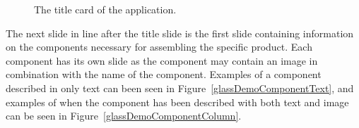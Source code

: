 	
	\begin{figure}[ht!]
		\centering
   		 \qquad
   		 \qquad
		\caption{The title card of the application.}
		\label{glassDemoTitleCard}
	\end{figure}
	
The next slide in line after the title slide is the first slide containing information on the components necessary for assembling the specific product. Each component has its own slide as the component may contain an image in combination with the name of the component. Examples of a component described in only text can been seen in Figure~\ref{glassDemoComponentText}, and examples of when the component has been described with both text and image can be seen in Figure~\ref{glassDemoComponentColumn}.


